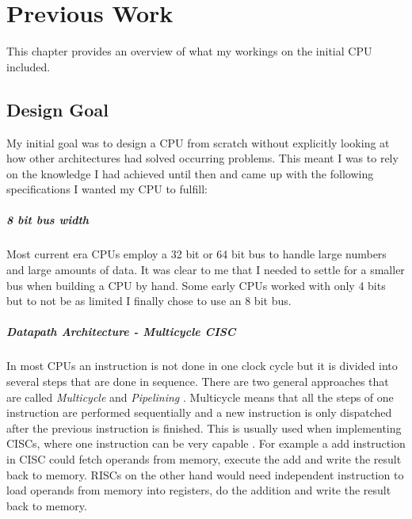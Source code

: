 
\chapter{Previous Work}\label{cha:prev}
This chapter provides an overview of what my workings on the initial \gls{CPU} included.

\section{Design Goal}
My initial goal was to design a \gls{CPU} from scratch without explicitly looking at how other architectures had solved occurring problems.
This meant I was to rely on the knowledge I had achieved until then and came up with the following specifications I wanted my \gls{CPU} to fulfill:
\paragraph{8 bit bus width}
Most current era \glspl{CPU} employ a 32 bit or 64 bit bus to handle large numbers and large amounts of data.
It was clear to me that I needed to settle for a smaller bus when building a \gls{CPU} by hand.
Some early \glspl{CPU} worked with only 4 bits but to not be as limited I finally chose to use an 8 bit bus.
\paragraph{Datapath Architecture - Multicycle CISC}
In most \glspl{CPU} an instruction is not done in one clock cycle but it is divided into several steps that are done in sequence.
There are two general approaches that are called \emph{Multicycle} and \emph{Pipelining} \cite{PattersonDavid2016RuRD}.
Multicycle means that all the steps of one instruction are performed sequentially and a new instruction is only dispatched after the previous instruction is finished.
This is usually used when implementing \glspl{CISC}, where one instruction can be very capable \cite{chen_novick_shimano_2000}.
For example a add instruction in \gls{CISC} could fetch operands from memory, execute the add and write the result back to memory.
\glspl{RISC} on the other hand would need independent instruction to load operands from memory into registers, do the addition and write the result back to memory.

